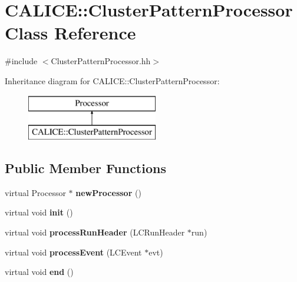 \section{C\-A\-L\-I\-C\-E\-:\-:Cluster\-Pattern\-Processor Class Reference}
\label{classCALICE_1_1ClusterPatternProcessor}


{\ttfamily \#include $<$Cluster\-Pattern\-Processor.\-hh$>$}

Inheritance diagram for C\-A\-L\-I\-C\-E\-:\-:Cluster\-Pattern\-Processor\-:\begin{figure}[H]
\begin{center}
\leavevmode
\includegraphics[height=2.000000cm]{classCALICE_1_1ClusterPatternProcessor}
\end{center}
\end{figure}
\subsection*{Public Member Functions}
\begin{DoxyCompactItemize}
\item 
virtual Processor $\ast$ {\bfseries new\-Processor} ()\label{classCALICE_1_1ClusterPatternProcessor_aee6d74ab69cf1a8b78964049490a2c49}

\item 
virtual void {\bfseries init} ()\label{classCALICE_1_1ClusterPatternProcessor_a0ae021ab872248ee9ec3b9804412addb}

\item 
virtual void {\bfseries process\-Run\-Header} (L\-C\-Run\-Header $\ast$run)\label{classCALICE_1_1ClusterPatternProcessor_a7149fcb85cff870aaa634b54a37a211a}

\item 
virtual void {\bfseries process\-Event} (L\-C\-Event $\ast$evt)\label{classCALICE_1_1ClusterPatternProcessor_ab3b03b66a70ade9ea67dfb43a5755ff1}

\item 
virtual void {\bfseries end} ()\label{classCALICE_1_1ClusterPatternProcessor_a68bf2e0dcd9cceafaf99a08fa48c8e90}

\end{DoxyCompactItemize}


